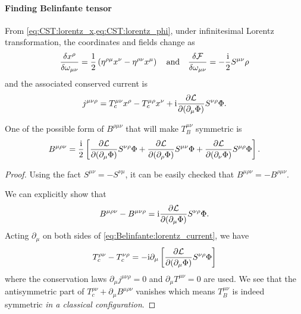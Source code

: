 \documentclass[10pt]{article}
\newcommand{\ii}{\mathrm{i}}
\begin{document}
\paragraph{Finding Belinfante tensor}
From \cref{eq:CST:lorentz_x,eq:CST:lorentz_phi}, under infinitesimal Lorentz transformation, the coordinates and fields change as
\begin{align}
    \fdv{x^\rho}{\omega_{\mu\nu}}=\frac{1}{2}\left(\eta^{\rho\mu}x^\nu-\eta^{\rho\nu}x^\mu\right)\qand\fdv{\mathcal{F}}{\omega_{\mu\nu}}=-\frac{\ii}{2}S^{\mu\nu}\rho
\end{align}
and the associated conserved current is
\begin{align}
    j^{\mu\nu\rho}=T^{\mu\nu}_c x^\rho-T^{\mu\rho}_c x^\nu+\ii\pdv{\mathcal{L}}{(\partial_\mu\Phi)}S^{\nu\rho}\Phi.\label{eq:Belinfante:lorentz_current}
\end{align}
\begin{claim}
    One of the possible form of $B^{\rho\mu\nu}$ that will make $T^{\mu\nu}_B$ symmetric is
    \begin{align}
        B^{\mu\rho\nu}=\frac{\ii}{2}\left[\pdv{\mathcal{L}}{(\partial_\mu\Phi)}S^{\nu\rho}\Phi+\pdv{\mathcal{L}}{(\partial_\rho\Phi)}S^{\mu\nu}\Phi+\pdv{\mathcal{L}}{(\partial_\nu\Phi)}S^{\mu\rho}\Phi\right].\label{eq:Belinfante:B}
    \end{align}
\end{claim}
\begin{proof}
    Using the fact $S^{\mu\nu}=-S^{\nu\mu}$, it can be easily checked that $B^{\mu\rho\nu}=-B^{\rho\mu\nu}$.

    We can explicitly show that
    \begin{align}
        B^{\mu\rho\nu}-B^{\mu\nu\rho}=\ii\pdv{\mathcal{L}}{(\partial_\mu\Phi)}S^{\nu\rho}\Phi.
    \end{align}
    Acting $\partial_\mu$ on both sides of \cref{eq:Belinfante:lorentz_current}, we have
    \begin{align}
        T^{\rho\nu}_c-T^{\nu\rho}_c=-\ii\partial_\mu\left[\pdv{\mathcal{L}}{(\partial_\mu\Phi)}S^{\nu\rho}\Phi\right]
    \end{align}
    where the conservation laws $\partial_\mu j^{\mu\nu\rho}=0$ and $\partial_\mu T^{\mu\nu}=0$ are used.
    We see that the antisymmetric part of $T^{\rho\nu}_c+\partial_\mu B^{\mu\rho\nu}$ vanishes which means $T^{\mu\nu}_B$ is indeed symmetric \textit{in a classical configuration}\snm.
\end{proof}
\end{document}
